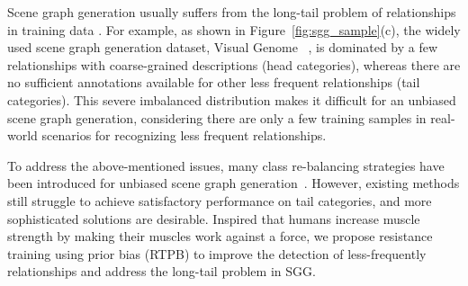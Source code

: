 Scene graph generation usually suffers from the long-tail problem of relationships in training data \cite{Tang2020_unbiased,chen2019knowledge,zhan2019exploring}. 
For example, as shown in Figure~\ref{fig:sgg_sample}(c), the widely used scene graph generation dataset, Visual Genome ~\cite{krishna2016visual}, is dominated by a few relationships with coarse-grained descriptions (head categories), whereas there are no sufficient annotations available for other less frequent relationships (tail categories). This severe imbalanced distribution makes it difficult for an unbiased scene graph generation, considering there are only a few training samples in real-world scenarios for recognizing less frequent relationships.


To address the above-mentioned issues, many class re-balancing strategies have been introduced for unbiased scene graph generation~\cite{Tang2020_unbiased,li2021bipartite}. However, existing methods still struggle to achieve satisfactory performance on tail categories, and more sophisticated solutions are desirable. 
Inspired that humans increase muscle strength by making their muscles work against a force, we propose resistance training using prior bias (RTPB) to improve the detection of less-frequently relationships and address the long-tail problem in SGG.
